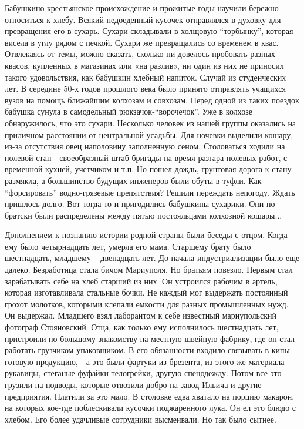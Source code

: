 Бабушкино крестьянское происхождение и прожитые годы научили бережно относиться
к хлебу. Всякий недоеденный кусочек отправлялся в духовку для превращения его в
сухарь. Сухари складывали в холщовую \enquote{торбынку}, которая висела в углу рядом с
печкой. Сухари же превращались со временем в квас. Отвлекаясь от темы, можно
сказать, сколько ни довелось пробовать разных квасов, купленных в магазинах или
«на разлив», ни один из них не приносил такого удовольствия, как бабушкин
хлебный напиток. Случай из студенческих лет. В середине 50-х годов прошлого
века было принято отправлять учащихся вузов на помощь ближайшим колхозам и
совхозам. Перед одной из таких поездок бабушка сунула в самодельный
рюкзачок-\enquote{ворочечок}. Уже в колхозе обнаружилось, что это сухари. Несколько
человек из нашей группы оказались на приличном расстоянии от центральной
усадьбы. Для ночевки выделили кошару, из-за отсутствия овец наполовину
заполненную сеном. Столоваться ходили на полевой стан - своеобразный штаб
бригады на время разгара полевых работ, с временной кухней, учетчиком и т.п. Но
пошел дождь, грунтовая дорога к стану размякла, а большинство будущих инженеров
были обуты в туфли. Как \enquote{форсировать} водно-грязевые препятствия? Решили
переждать непогоду. Ждать пришлось долго. Вот тогда-то и пригодились бабушкины
сухарики. Они по-братски были распределены между пятью постояльцами колхозной
кошары...

Дополнением к познанию истории родной страны были беседы с отцом. Когда ему
было четырнадцать лет, умерла его мама. Старшему брату было шестнадцать,
младшему – двенадцать лет. До начала индустриализации было еще далеко.
Безработица стала бичом Мариуполя. Но братьям повезло. Первым стал зарабатывать
себе на хлеб старший из них. Он устроился рабочим в артель, которая
изготавливала стальные бочки. Не каждый мог выдержать постоянный грохот
молотков, которыми клепали емкости для разных промышленных нужд. Он выдержал.
Младшего взял лаборантом к себе известный мариупольский фотограф Стояновский.
Отца, как только ему исполнилось шестнадцать лет, пристроили по большому
знакомству на местную швейную фабрику, где он стал работать
грузчиком-упаковщиком. В его обязанности входило связывать в кипы готовую
продукцию, - а это были фартуки из брезента, из этого же материала рукавицы,
стеганые фуфайки-телогрейки, другую спецодежду. Потом все это грузили на
подводы, которые отвозили добро на завод Ильича и другие предприятия. Платили
за это мало. В столовке едва хватало на порцию макарон, на которых кое-где
поблескивали кусочки поджаренного лука. Он ел это блюдо с хлебом. Его более
удачливые сотрудники высмеивали. Но так было сытнее.

